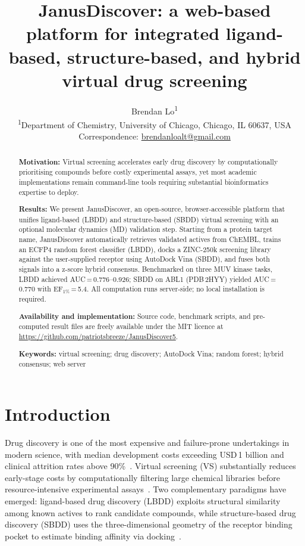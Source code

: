 \documentclass[12pt,a4paper]{article}
\title{
  \textbf{JanusDiscover}: a web-based platform for integrated ligand-based,
  structure-based, and hybrid virtual drug screening
}
\author{
  Brendan Lo\textsuperscript{1}
  \\[0.5em]
  \small\textsuperscript{1}Department of Chemistry,
  University of Chicago, Chicago, IL 60637, USA
  \\[0.2em]
  \small Correspondence: \href{mailto:brendanloalt@gmail.com}{brendanloalt@gmail.com}
}
\date{}   %
\begin{document}
\maketitle

\begin{abstract}
\textbf{Motivation:}
Virtual screening accelerates early drug discovery by computationally
prioritising compounds before costly experimental assays, yet most academic
implementations remain command-line tools requiring substantial
bioinformatics expertise to deploy.

\textbf{Results:}
We present JanusDiscover, an open-source, browser-accessible platform that
unifies ligand-based (LBDD) and structure-based (SBDD) virtual screening
with an optional molecular dynamics (MD) validation step.  Starting from a
protein target name, JanusDiscover automatically retrieves validated actives
from ChEMBL, trains an ECFP4 random forest classifier (LBDD), docks a
ZINC-250k screening library against the user-supplied receptor using
AutoDock Vina (SBDD), and fuses both signals into a z-score hybrid
consensus.  Benchmarked on three MUV kinase tasks, LBDD achieved
AUC\,=\,0.776–0.926; SBDD on ABL1 (PDB\,2HYY) yielded AUC\,=\,0.770 with
$\text{EF}_{1\%}$\,=\,5.4.  All computation runs server-side; no local
installation is required.

\textbf{Availability and implementation:}
Source code, benchmark scripts, and pre-computed result files are freely
available under the MIT licence at
\url{https://github.com/patriotsbreeze/JanusDiscover5}.

\medskip
\noindent\textbf{Keywords:} virtual screening; drug discovery; AutoDock Vina;
random forest; hybrid consensus; web server
\end{abstract}

\newpage

\section*{Introduction}

Drug discovery is one of the most expensive and failure-prone undertakings
in modern science, with median development costs exceeding USD\,1 billion
and clinical attrition rates above 90\%~\cite{dimasi2016innovation,wouters2020estimated}.
Virtual screening (VS) substantially reduces early-stage costs by
computationally filtering large chemical libraries before resource-intensive
experimental assays~\cite{kitchen2004docking,sliwoski2014computational}.
Two complementary paradigms have emerged: ligand-based drug discovery
(LBDD) exploits structural similarity among known actives to rank candidate
compounds, while structure-based drug discovery (SBDD) uses the
three-dimensional geometry of the receptor binding pocket to estimate
binding affinity via docking~\cite{sliwoski2014computational}.
\end{document}
